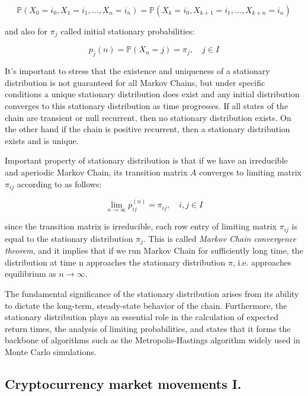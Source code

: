 \begin{equation}
    \mathbb{P}(X_0=i_0,X_1=i_1,\ldots,X_n=i_n) = \mathbb{P}(X_k=i_0,X_{k+1}=i_1,\ldots,X_{k+n}=i_n)
\end{equation}

and also for $\pi_j$ called initial stationary probabilities:

\begin{equation} \label{eq:init_stationary}
    p_j(n) = \mathbb{P}(X_n = j) = \pi_j, \quad j \in I
\end{equation}

It's important to stress that the existence and uniqueness of a stationary distribution 
is not guaranteed for all Markov Chains, but under specific conditions a unique stationary 
distribution does exist and any initial distribution converges to this stationary distribution \citep{Praskova2012} as time progresses.
If all states of the chain are transient or null recurrent, then no stationary distribution exists. On the other hand if the chain is
positive recurrent, then a stationary distribution exists and is unique.

Important property of stationary distribution is that if we have an irreducible and aperiodic Markov Chain, its transition matrix $A$ converges to limiting matrix $\pi_{ij}$ according to \citep{Haggstrom2002} as follows:

\begin{equation}
    \lim_{n \to \infty} p_{ij}^{(n)} = \pi_{ij}, \quad i,j \in I
\end{equation}

since the transition matrix is irreducible, each row entry of limiting matrix $\pi_{ij}$ is equal to the stationary distribution $\pi_j$. This is called \textit{Markov Chain convergence theorem}, and it implies that if we run 
Markov Chain for sufficiently long time, the distribution at time n approaches the stationary distribution $\pi$, i.e. approaches equilibrium as $n \to \infty$.
 
The fundamental significance of the stationary distribution arises from its ability to dictate the long-term, 
steady-state behavior of the chain. Furthermore, the stationary distribution plays an essential role in the 
calculation of expected return times, the analysis of limiting probabilities, and \citep{Navarro2011} states that it forms the backbone of
algorithms such as the Metropolis-Hastings algorithm widely used in Monte Carlo simulations.

\subsection{Cryptocurrency market movements I.}

